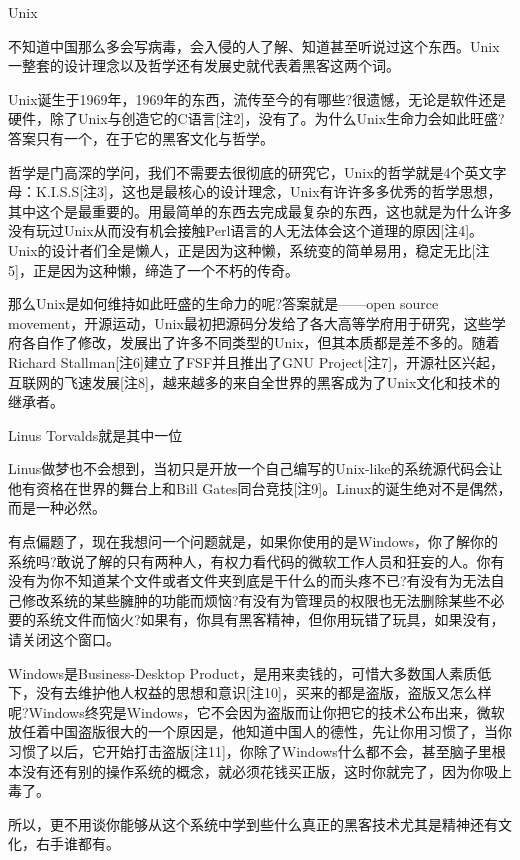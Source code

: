\documentclass[12pt,a4paper]{article}
\begin{document}
\begin{CJK}{UTF8}{gbsn}
\begin{LARGE}
Unix
\end{LARGE}

不知道中国那么多会写病毒，会入侵的人了解、知道甚至听说过这个东西。Unix一整套的设计理念以及哲学还有发展史就代表着黑客这两个词。

Unix诞生于1969年，1969年的东西，流传至今的有哪些?很遗憾，无论是软件还是硬件，除了Unix与创造它的C语言[注2]，没有了。为什么Unix生命力会如此旺盛?答案只有一个，在于它的黑客文化与哲学。

哲学是门高深的学问，我们不需要去很彻底的研究它，Unix的哲学就是4个英文字母：K.I.S.S[注3]，这也是最核心的设计理念，Unix有许许多多优秀的哲学思想，其中这个是最重要的。用最简单的东西去完成最复杂的东西，这也就是为什么许多没有玩过Unix从而没有机会接触Perl语言的人无法体会这个道理的原因[注4]。Unix的设计者们全是懒人，正是因为这种懒，系统变的简单易用，稳定无比[注5]，正是因为这种懒，缔造了一个不朽的传奇。

那么Unix是如何维持如此旺盛的生命力的呢?答案就是——open source movement，开源运动，Unix最初把源码分发给了各大高等学府用于研究，这些学府各自作了修改，发展出了许多不同类型的Unix，但其本质都是差不多的。随着Richard Stallman[注6]建立了FSF并且推出了GNU Project[注7]，开源社区兴起，互联网的飞速发展[注8]，越来越多的来自全世界的黑客成为了Unix文化和技术的继承者。

Linus Torvalds就是其中一位

Linus做梦也不会想到，当初只是开放一个自己编写的Unix-like的系统源代码会让他有资格在世界的舞台上和Bill Gates同台竞技[注9]。Linux的诞生绝对不是偶然，而是一种必然。

有点偏题了，现在我想问一个问题就是，如果你使用的是Windows，你了解你的系统吗?敢说了解的只有两种人，有权力看代码的微软工作人员和狂妄的人。你有没有为你不知道某个文件或者文件夹到底是干什么的而头疼不已?有没有为无法自己修改系统的某些臃肿的功能而烦恼?有没有为管理员的权限也无法删除某些不必要的系统文件而恼火?如果有，你具有黑客精神，但你用玩错了玩具，如果没有，请关闭这个窗口。

Windows是Business-Desktop Product，是用来卖钱的，可惜大多数国人素质低下，没有去维护他人权益的思想和意识[注10]，买来的都是盗版，盗版又怎么样呢?Windows终究是Windows，它不会因为盗版而让你把它的技术公布出来，微软放任着中国盗版很大的一个原因是，他知道中国人的德性，先让你用习惯了，当你习惯了以后，它开始打击盗版[注11]，你除了Windows什么都不会，甚至脑子里根本没有还有别的操作系统的概念，就必须花钱买正版，这时你就完了，因为你吸上毒了。

所以，更不用谈你能够从这个系统中学到些什么真正的黑客技术尤其是精神还有文化，右手谁都有。


\end{CJK}
\end{document}
